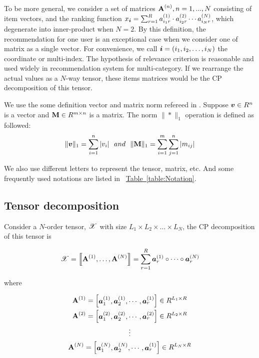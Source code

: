 \documentclass[letterpaper]{article}
\newcommand{\Sca}[3]{{#1}^{(#2)}_{i_#2#3}}%
\newcommand{\T}[1]{\boldsymbol{\mathscr{\MakeUppercase{#1}}}}
\newcommand{\KT}[1]{\left\llbracket #1 \right\rrbracket}
\newcommand{\V}[1]{{\bm{{\MakeLowercase{#1}}}}}
\newcommand{\VnC}[3]{\V{#1}^{(#2)}_{#3}}
\newcommand{\M}[1]{{\bm{\mathbf{\MakeUppercase{#1}}}}}
\newcommand{\Mn}[2]{\M{#1}^{(#2)}}
\newcommand{\norm}[2]{\|#1\|_{#2}}
\newcommand{\Table}[1] {\hyperref[table:#1] {Table~\ref*{table:#1}}} %
\newcommand{\Coord}{(i_1,i_2,\ldots,i_N)}
\begin{document}
To be more general, we consider a set of matrices
$\M{A}^{(n)},n = 1,...,N$ consisting of item vectors, and the ranking function
$x_\V{i} = \sum_{r=1}^{R}\Sca{a}{1}{r}\cdot\Sca{a}{2}{r}\cdots\Sca{a}{N}{r}$,
which degenerate into inner-product when $N=2$.
By this definition, the recommendation for one user is an exceptional case when we consider one of matrix as a single vector.
For convenience, we call $\V{i} = \Coord$ the coordinate or multi-index. The hypothesis of relevance criterion is reasonable and used widely in recommendation system for multi-category. If we rearrange the actual values as a $N$-way tensor, these items matrices would be the CP decomposition of this tensor.

We use the some definition vector and matrix norm refereed in \cite{BaPiKoSe15}.
Suppose $\V{v}\in R^n$ is a vector and $\M{M}\in R^{m\times n}$ is a matrix.
The norm $\norm{*}{1}$ operation is defined as followed:
\[
    \norm{\V{v}}{1} = \sum_{i=1}^{n}|v_i|
    \ \  and \ \
    \norm{\M{M}}{1} = \sum_{i=1}^{m}\sum_{j=1}^{n}|m_{ij}|
\]

We also use different letters to represent the tensor, matrix, etc.
And some frequently used notations are listed in ~\Table{Notation}.

\subsection{Tensor decomposition}

Consider a $N$-order tensor, $\T{X}$ with size $L_1\times L_2\times\ldots\times L_N$,
the CP decomposition\cite{KoBa09} of this tensor is

\begin{equation}\label{eq:CPDecomposition}
\T{X}= \KT{ \Mn{A}{1},\dots,\Mn{A}{N}} =
\sum_{r=1}^{R}\VnC{A}{1}{r} \circ \cdots \circ \VnC{A}{N}{r}
\end{equation}

where

\begin{gather*}\label{eq:ColumnVectorsForm}
\M{A}^{(1)} =
\begin{bmatrix}\VnC{a}{1}{1},\VnC{a}{1}{2},\cdots,\VnC{a}{1}{r}\end{bmatrix}\in R^{L_1\times R}\\
\M{A}^{(2)} =
\begin{bmatrix}\VnC{a}{2}{1},\VnC{a}{2}{2},\cdots,\VnC{a}{2}{r}\end{bmatrix}\in R^{L_2\times R}\\
\vdots\\
\M{A}^{(N)} =
\begin{bmatrix}\VnC{a}{N}{1},\VnC{a}{N}{2},\cdots,\VnC{a}{1}{r}\end{bmatrix}\in R^{L_N\times R}\\
\end{gather*}
\end{document}
